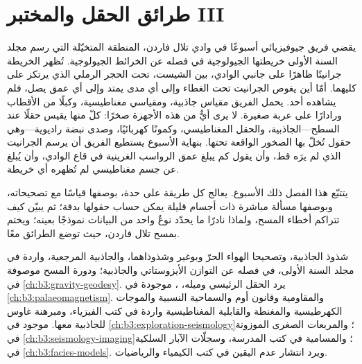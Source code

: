 \chapter{طرائق الحقل والمختبر III}\label{ch:b3:field-lab-methods-3}

يقضي فريق جيوفيزيائي أسبوعًا في وادي تلال فاردن،
المنطقة المتخيّلة التي رسم مجلد السنة الأولى خريطتها الجيولوجية في
فصله عن الخرائط الجيولوجية. تُظهر الخريطة جرانيتًا ظاهرًا على
جانبي الوادي، بين الشيست، تحت الحجر الرملي الذي يرتكز على
كليهما. أمّا أين يغوص الجرانيت تحت الغطاء وإلى أي مدى يمتد
وإلى أي عمق يصل، فلم يشاهده أحد. يحمل الفريق
مقياس جاذبية، ومقياسي مغناطيسية، وكبلًا من الأقطاب ورادارًا على
عربة صغيرة. لا يرى أيٌّ من هذه الأجهزة صخرًا: كلّ منها يقيس
حقلًا عند السطح---الجاذبية، والحقل المغناطيسي، وكمونًا كهربائيًا،
وصدى نبضة راديوية---وهي حقول تُخلّ بها الصخور الواقعة تحتها.
بنهاية الأسبوع يستطيع الفريق أن يرسم الجرانيت الذي لم يرَه قط، وأن يقول
كم يبلغ عمق الرواسب الغرينية في قاع الوادي، وأن يُبلغ عن جسم مغناطيسي
لم تُظهره أي خريطة.

يتتبّع هذا الفصل ذلك الأسبوع. يعالج كل طريقة على حدة، بوصفها قياسًا مع تصحيحاته،
وبوصفها مسألة مباشرة ذات أجسام قليلة يمكن حساب حقولها بدقة؛
ثم يبيّن كيف تتراكم أخطاء المسح، ولماذا
نادرًا ما يحدّد نوعٌ واحد من البيانات نموذجًا بعينه؛ ويختم بمسح تلال فاردن، حيث توضع
الطرائق
معًا.

\begin{recall}
شذوذ الجاذبية، وتصحيحا الهواء الحرّ وبوغير وشذوذاهما،
والجاذبية المرجعية، واردة في مجلد السنة الأولى، في فصله عن التوازن الأيزوستاتي
والجاذبية؛ ودورة المسح  موصوفة في
\cref{ch:b3:gravity-geodesy}. يرد الحقل الرئيسي وميله، ،  موجودة في
\cref{ch:b3:palaeomagnetism}. والمقاومية وقانون أوم والسماحية النسبية
والموجات الكهرطيسية والمغنطة والقابلية المغناطيسية واردة في كتب الفيزياء،
ومبرهنة غاوس للجاذبية معها.
 موجود في
\cref{ch:b3:exploration-seismology}؛   والمربعات
الصغرى الموزونة في \cref{ch:b3:seismology-imaging}؛ والمسامية في
كتب المدرسة، وسجلّات الآبار السلكية في \cref{ch:b3:facies-models}. ويرد
انتشار عدم اليقين في كتب الكيمياء والرياضيات.
\end{recall}


